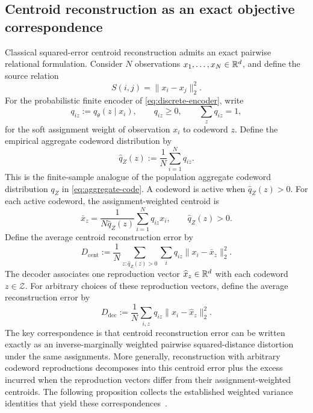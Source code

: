 \subsection{Centroid reconstruction as an exact objective correspondence}
\label{sec:vq}

Classical squared-error centroid reconstruction admits an exact pairwise relational formulation.
Consider $N$ observations $x_1,\ldots,x_N\in\mathbb{R}^d$, and define the source relation
\[
S(i,j)=\|x_i-x_j\|_2^2.
\]
For the probabilistic finite encoder of \cref{eq:discrete-encoder}, write
\[
q_{iz}:=q_\theta(z\mid x_i),
\qquad
q_{iz}\ge0,
\qquad
\sum_zq_{iz}=1,
\]
for the soft assignment weight of observation $x_i$ to codeword $z$.
Define the empirical aggregate codeword distribution by
\[
\hat q_Z(z)
:=
\frac1N\sum_{i=1}^Nq_{iz}.
\]
This is the finite-sample analogue of the population aggregate codeword distribution $q_Z$ in \cref{eq:aggregate-code}.
A codeword is active when $\hat q_Z(z)>0$.
For each active codeword, the assignment-weighted centroid is
\begin{equation}
\bar x_z
=
\frac{1}{N\hat q_Z(z)}
\sum_{i=1}^Nq_{iz}x_i,
\qquad
\hat q_Z(z)>0.
\label{eq:finite-soft-centroid}
\end{equation}
Define the average centroid reconstruction error by
\[
D_{\mathrm{cent}}
:=
\frac1N
\sum_{z:\hat q_Z(z)>0}
\sum_iq_{iz}\|x_i-\bar x_z\|_2^2.
\]
The decoder associates one reproduction vector $\widehat x_z\in\mathbb{R}^d$ with each codeword $z\in\mathcal Z$.
For arbitrary choices of these reproduction vectors, define the average reconstruction error by
\[
D_{\mathrm{dec}}
:=
\frac1N
\sum_{i,z}q_{iz}\|x_i-\widehat x_z\|_2^2.
\]
The key correspondence is that centroid reconstruction error can be written exactly as an inverse-marginally weighted pairwise squared-distance distortion under the same assignments.
More generally, reconstruction with arbitrary codeword reproductions decomposes into this centroid error plus the excess incurred when the reproduction vectors differ from their assignment-weighted centroids.
The following proposition collects the established weighted variance identities that yield these correspondences~\citep{gray1998quantization,dhillon2004kernel}.

